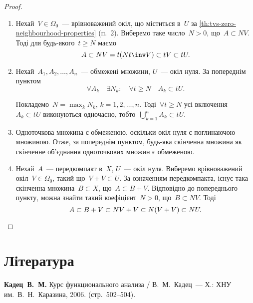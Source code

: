 \begin{proof}
    \listhack
    \begin{enumerate}
        \item Нехай~$V \in \Omega_0$~--- врівноважений окіл, що міститься в~$U$ за \cref{th:tvs-zero-neighbourhood-properties} (п.~2). Виберемо таке число~$N > 0$, що~$A \subset N V$. Тоді для будь-якого~$t \ge N$ маємо
        \begin{equation*}
            A \subset N V = t(N t\inv V) \subset t V \subset t U.
        \end{equation*}

        \item Нехай~$A_1, A_2, \dots, A_n$~--- обмежені множини, $U$~--- окіл нуля. За попереднім пунктом
        \begin{equation*}
            \forall A_k \quad \exists N_k: \quad \forall t \ge N \quad A_k \subset t U.
        \end{equation*}

        Покладемо~$N = \max_k N_k$, $k = 1, 2, \dots, n$. Тоді~$\forall t \ge N$ усі включення~$A_k \subset t U$ виконуються одночасно, тобто~$\bigcup_{k = 1}^n A_k \subset t U$.

        \item Одноточкова множина є обмеженою, оскільки окіл нуля є поглинаючою множиною. Отже, за попереднім пунктом, будь-яка скінченна множина як скінченне об'\-єд\-на\-ння одноточкових множин є обмеженою.

        \item Нехай~$A$~--- передкомпакт в~$X$, $U$~--- окіл нуля. Виберемо врівноважений окіл~$V \in \Omega_0$, такий що~$V + V \subset U$. За означенням передкомпакта, існує така скінченна множина~$B \subset X$, що~$A \subset B + V$. Відповідно до попереднього пункту, можна знайти такий коефіцієнт~$N > 0$, що~$B \subset N V$. Тоді
        \begin{equation*}
            A \subset B + V \subset NV + V \subset N(V + V) \subset N U. \qedhere
        \end{equation*}
    \end{enumerate}
\end{proof}

\section{Література}

\begin{enumerate}[label={[\arabic*]}]
\item \textbf{Кадец~В.~М.}
Курс функционального анализа /
В.~М.~Кадец~---
Х.: ХНУ им.~В.~Н.~Каразина, 2006. (стр.~502--504).
\end{enumerate}
